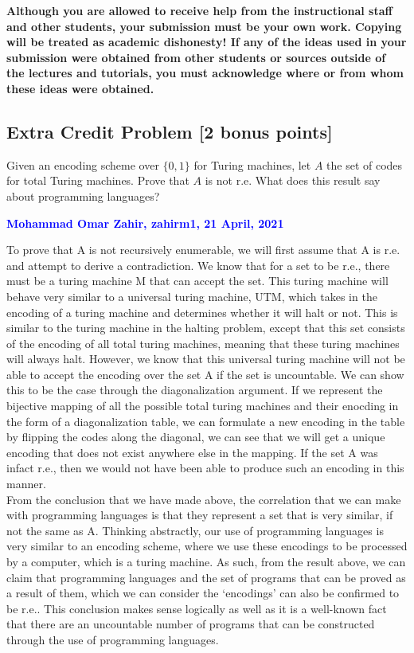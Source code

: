 \documentclass[11pt,fleqn]{article}
\newcommand{\set}[1]{{\{ #1 \}}}
\begin{document}
\textbf{Although you are allowed to receive help from the
  instructional staff and other students, your submission must be your
  own work.  Copying will be treated as academic dishonesty! If any of
  the ideas used in your submission were obtained from other students
  or sources outside of the lectures and tutorials, you must
  acknowledge where or from whom these ideas were obtained.}

\newpage

\subsection*{Extra Credit Problem \textbf{[2 bonus points]}}

Given an encoding scheme over $\set{0,1}$ for Turing machines, let $A$
the set of codes for total Turing machines.  Prove that $A$ is not
r.e.  What does this result say about programming languages?

\bigskip

\noindent
\textcolor{blue}{\textbf{Mohammad Omar Zahir, zahirm1, 21 April, 2021}}

\bigskip

\noindent To prove that A is not recursively enumerable, we will first assume that A is r.e. and attempt to derive a contradiction. We know that for a set to be r.e., there must be a turing machine M that can accept the set. This turing machine will behave very similar to a universal turing machine, UTM, which takes in the encoding of a turing machine and determines whether it will halt or not. This is similar to the turing machine in the halting problem, except that this set consists of the encoding of all total turing machines, meaning that these turing machines will always halt. However, we know that this universal turing machine will not be able to accept the encoding over the set A if the set is uncountable. We can show this to be the case through the diagonalization argument. If we represent the bijective mapping of all the possible total turing machines and their enocding in the form of a diagonalization table, we can formulate a new encoding in the table by flipping the codes along the diagonal, we can see that we will get a unique encoding that does not exist anywhere else in the mapping. If the set A was infact r.e., then we would not have been able to produce such an encoding in this manner.\\

\noindent From the conclusion that we have made above, the correlation that we can make with programming languages is that they represent a set that is very similar, if not the same as A. Thinking abstractly, our use of programming languages is very similar to an encoding scheme, where we use these encodings to be processed by a computer, which is a turing machine. As such, from the result above, we can claim that programming languages and the set of programs that can be proved as a result of them, which we can consider the `encodings' can also be confirmed to be r.e.. This conclusion makes sense logically as well as it is a well-known fact that there are an uncountable number of programs that can be constructed through the use of programming languages.
\end{document}
